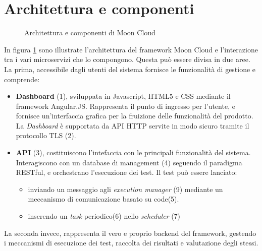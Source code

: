 \documentclass[../main.tex]{subfiles}
\begin{document}
\section{Architettura e componenti}
\begin{figure}[H]
\centering
{}
\caption{Architettura e componenti di Moon Cloud}\label{fig:MCArchi}
\end{figure}
In figura \ref{fig:MCArchi} sono illustrate l'architettura del framework Moon Cloud e l'interazione tra i vari microservizi che lo compongono.
Questa può essere divisa in due aree. La prima, accessibile dagli utenti del sistema fornisce le funzionalità di gestione e comprende:
\begin{itemize}
    \item \textbf{Dashboard} (1), sviluppata in Javascript, HTML5 e CSS mediante il framework Angular.JS. Rappresenta il punto di ingresso per l'utente, e fornisce un'interfaccia grafica per la fruizione delle funzionalità del prodotto. La \textit{Dashboard} è supportata da API HTTP servite in modo sicuro tramite il protocollo TLS (2).
    \item \textbf{API} (3), costituiscono l'intefaccia con le principali funzionalità del sistema. Interagiscono con un database di management (4) seguendo il paradigma RESTful, e orchestrano l'esecuzione dei test.
        Il test può essere lanciato:
        \begin{itemize}
            \item inviando un messaggio agli \textit{execution manager} (9) mediante un meccanismo di comunicazione basato su code(5).
            \item inserendo un \textit{task} periodico(6) nello \textit{scheduler} (7)
        \end{itemize}
\end{itemize}
La seconda invece, rappresenta il vero e proprio backend del framework, gestendo i meccanismi di esecuzione dei test, raccolta dei risultati e valutazione degli stessi.
\end{document}
